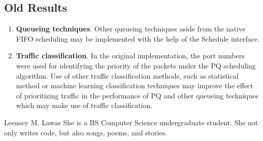 \documentclass[journal]{IEEE/IEEEtran}
\newcommand{\ADVISEE}{Leensey M. Lawas}
\begin{document}
\subsection{Old Results}
\begin{enumerate}
  \item \textbf{Queueing techniques}. Other queueing techniques aside from the native FIFO scheduling may be implemented with the help of the Schedule interface.
  \item \textbf{Traffic classification}. In the original implementation, the port numbers were used for identifying the priority of the packets under the PQ scheduling algorithm. Use of other traffic classification methods, such as statistical method or machine learning classification techniques may improve the effect of prioritizing traffic in the performance of PQ and other queueing techniques which may make use of traffic classification.
\end{enumerate}




\begin{biography}{\ADVISEE}
She is a BS Computer Science undergraduate student. She not only writes code, but also songs, poems, and stories.
\end{biography}
\end{document}
